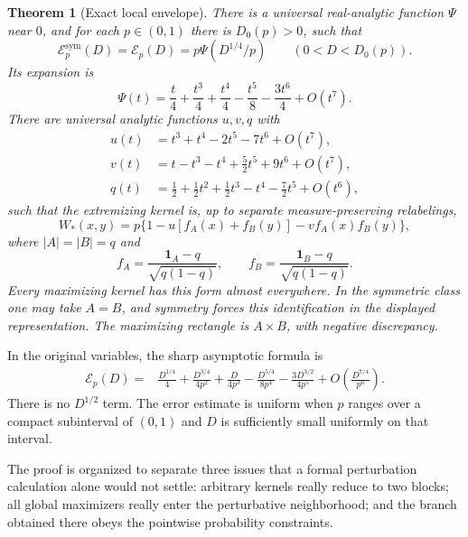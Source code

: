 \documentclass[11pt]{article}
\newtheorem{theorem}{Theorem}[section]
\theoremstyle{definition}
\newcommand{\1}{\mathbf 1}
\newcommand{\calE}{\mathcal E}
\begin{document}
\begin{theorem}[Exact local envelope]\label{thm:main}
There is a universal real-analytic function $\Psi$ near $0$, and for each $p\in(0,1)$ there is $D_0(p)>0$, such that
\begin{equation}\label{eq:envelope}
 \calE_p^{\mathrm{sym}}(D)=\calE_p(D)=p\Psi(D^{1/4}/p)
 \qquad(0<D<D_0(p)).
\end{equation}
Its expansion is
\begin{equation}\label{eq:series}
 \Psi(t)=\frac t4+\frac{t^3}4+\frac{t^4}4-\frac{t^5}8-\frac{3t^6}4+O(t^7).
\end{equation}
There are universal analytic functions $u,v,q$ with
\begin{align}
 u(t)&=t^3+t^4-2t^5-7t^6+O(t^7),\label{eq:uexp}\\
 v(t)&=t-t^3-t^4+\tfrac52t^5+9t^6+O(t^7),\label{eq:vexp}\\
 q(t)&=\tfrac12+\tfrac12t^2+\tfrac12t^3-t^4-\tfrac72t^5+O(t^6),\label{eq:qexp}
\end{align}
such that the extremizing kernel is, up to separate measure-preserving relabelings,
\begin{equation}\label{eq:extremizer}
 W_*(x,y)=p\{1-u[f_A(x)+f_B(y)]-v f_A(x)f_B(y)\},
\end{equation}
where $|A|=|B|=q$ and
\[
 f_A=\frac{\1_A-q}{\sqrt{q(1-q)}},\qquad
 f_B=\frac{\1_B-q}{\sqrt{q(1-q)}}.
\]
Every maximizing kernel has this form almost everywhere. In the symmetric class one may take $A=B$, and symmetry forces this identification in the displayed representation. The maximizing rectangle is $A\times B$, with negative discrepancy.
\end{theorem}

In the original variables, the sharp asymptotic formula is
\begin{align}
\calE_p(D)={}&\frac{D^{1/4}}4+\frac{D^{3/4}}{4p^2}
 +\frac{D}{4p^3}-\frac{D^{5/4}}{8p^4}
 -\frac{3D^{3/2}}{4p^5}
 +O\!\left(\frac{D^{7/4}}{p^6}\right).\label{eq:originalseries}
\end{align}
There is no $D^{1/2}$ term. The error estimate is uniform when $p$ ranges over a compact subinterval of $(0,1)$ and $D$ is sufficiently small uniformly on that interval.

The proof is organized to separate three issues that a formal perturbation calculation alone would not settle: arbitrary kernels really reduce to two blocks; all global maximizers really enter the perturbative neighborhood; and the branch obtained there obeys the pointwise probability constraints.
\end{document}

